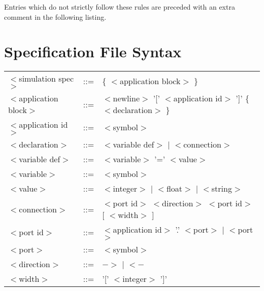 \documentclass[a4paper,twoside]{report}
\begin{document}
Entries which do not strictly follow these rules are preceded with an
extra comment in the following listing.



\chapter{Specification File Syntax}
\label{sec:specsyntax}

\newcommand{\nt}[1]{$<$#1$>$}

\begin{tabular}{lcl}
\nt{simulation spec}   & ::= & \{ \nt{application block} \} \\
\nt{application block} & ::= & \nt{newline} '[' \nt{application id} ']' \{ \nt{declaration}
\} \\
\nt{application id}    & ::= & \nt{symbol} \\
\nt{declaration}       & ::= & \nt{variable def} $|$ \nt{connection} \\
\nt{variable def}      & ::= & \nt{variable} '=' \nt{value} \\
\nt{variable}	       & ::= & \nt{symbol} \\
\nt{value} 	       & ::= & \nt{integer} $|$ \nt{float} $|$ \nt{string} \\
\nt{connection}	       & ::= & \nt{port id} \nt{direction} \nt{port id} [ \nt{width} ] \\
\nt{port id}	       & ::= & \nt{application id} '.' \nt{port} $|$
\nt{port} \\
\nt{port}	       & ::= & \nt{symbol} \\
\nt{direction}	       & ::= & $->$ $|$ $<-$ \\
\nt{width}	       & ::= & '[' \nt{integer} ']' \\
\end{tabular}

\printindex
\end{document}
